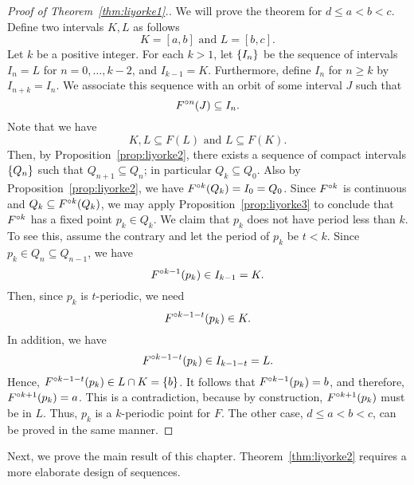 \documentclass[12pt,draft,twoside]{book}
\begin{document}
\begin{proof}[Proof of Theorem~\ref{thm:liyorke1}.]
  We will prove the theorem for $d \leq a < b < c$.
  Define two intervals $K,L$ as follows
  \begin{equation*}
    K = [a,b] \mbox{ and } L = [b,c].
  \end{equation*}
  Let $k$ be a positive integer.
  For each $k > 1$, let $\left \{ I_n \right \}$ be the sequence of intervals $I_n = L$ for $n = 0, \ldots, k-2$, and $I_{k-1} = K$.
  Furthermore, define $I_n$ for $n \geq k$ by $I_{n+k} = I_n$.
  We associate this sequence with an orbit of some interval $J$ such that
  \begin{equation*}
    F^{\circ n}(J) \subseteq I_n.
  \end{equation*}
  Note that we have 
  \begin{equation*}
    K,L \subseteq F(L) \mbox{ and } L \subseteq F(K).
  \end{equation*}
  Then, by Proposition~\ref{prop:liyorke2}, there exists a sequence of compact intervals $\left \{ Q_n \right \}$ such that $Q_{n+1} \subseteq Q_{n}$; in particular $Q_k \subseteq Q_0$.
  Also by Proposition~\ref{prop:liyorke2}, we have $F^{\circ k}(Q_k) = I_0 = Q_0$.
  Since $F^{\circ k}$ is continuous and $Q_k \subseteq F^{\circ k}(Q_k)$, we may apply Proposition~\ref{prop:liyorke3} to conclude that $F^{\circ k}$ has a fixed point $p_k \in Q_k$.
  We claim that $p_k$ does not have period less than $k$.
  To see this, assume the contrary and let the period of $p_k$ be $t < k$.
  Since $p_k \in Q_n \subseteq Q_{n-1}$, we have 
  \begin{equation*}
    F^{\circ k-1}(p_k) \in I_{k-1} = K.
  \end{equation*}
  Then, since $p_k$ is $t$-periodic, we need 
  \begin{equation*}
    F^{\circ k-1-t}(p_k) \in K.
  \end{equation*}
  In addition, we have
  \begin{equation*}
    F^{\circ k-1-t}(p_k) \in I_{k-1-t} = L.
  \end{equation*}
  Hence, $F^{\circ k-1-t}(p_k) \in L \cap K = \left \{ b \right \}$.
  It follows that $F^{\circ k-1}(p_k) = b$, and therefore, $F^{\circ k+1}(p_k) = a$.
  This is a contradiction, because by construction, $F^{\circ k+1}(p_k)$ must be in $L$.
  Thus, $p_k$ is a $k$-periodic point for $F$.
  The other case, $d \leq a < b < c$, can be proved in the same manner.
\end{proof}
Next, we prove the main result of this chapter.
Theorem~\ref{thm:liyorke2} requires a more elaborate design of sequences.
\end{document}

